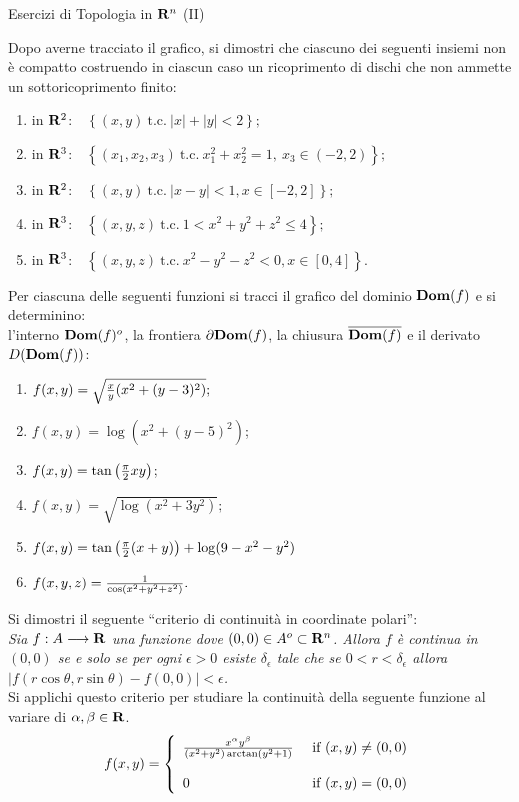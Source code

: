 
\centerline{\Large Esercizi di Topologia in ${\bf R}^n$ (II)}
\bigskip\bigskip
{} Dopo averne tracciato il grafico, si dimostri che
 ciascuno dei seguenti insiemi non \`e compatto costruendo in ciascun caso
un  ricoprimento di dischi che non ammette un sottoricoprimento 
finito:
\begin{enumerate}
\item in ${\bf R}^2$:\ \ $\left\{(x,y)\ \mbox{t.c.}\ |x|+|y|<2\right\};$
\item in ${\bf R}^3$:\ \ $\left\{(x_1,x_2,x_3)\ \mbox{t.c.}\ x_1^2+x_2^2=1,\ 
x_3\in(-2,2)\right\};$
\item in ${\bf R}^2$:\ \ $\left\{(x,y)\ \mbox{t.c.}\ |x-y|<1, x\in[-2,2]
\right\};$
\item in ${\bf R}^3$:\ \ $\left\{(x,y,z)\ \mbox{t.c.}\ 1<x^2+y^2+z^2\leq 4\right\};$
\item in  ${\bf R}^3$:\ \ $\left\{(x,y,z)\ \mbox{t.c.}\ x^2-y^2-z^2<0, x\in[0,4]\right\}.$
\end{enumerate}
\bigskip
{} Per ciascuna delle seguenti funzioni si tracci il grafico del 
dominio ${\bf Dom}(f)$ e si determinino:\\
l'interno ${\bf Dom}(f)^o$,
la frontiera $\partial{\bf Dom}(f)$, la chiusura $\overline{{\bf Dom}(f)}$
e il derivato $D({\bf Dom}(f))$:\medskip
\begin{enumerate}
\item $f(x,y)=\sqrt{{x\over y}(x^2+(y-3)^2)};$
\item $f(x,y)=\log(x^2+(y-5)^2)$;
\item $f(x,y)=\tan\left({\pi\over2}xy\right)$;
\item $f(x,y)=\sqrt{\log(x^2+3y^2)};$
\item $f(x,y)=\tan\left({\pi\over 2}(x+y)\right)+\log(9-x^2-y^2)$
\item $f(x,y,z)={1\over \cos (x^2+y^2+z^2)}.$
\end{enumerate}\bigskip
{} Si dimostri il seguente ``criterio di continuit\`a in coordinate polari'':\\
{\it Sia $f:A\longrightarrow {\bf R}$ una funzione dove $(0,0)\in A^o\subset{\bf R}^n$. Allora
$f$ \`e continua in $(0,0)$ se e solo se per ogni $\epsilon>0$ esiste $\delta_\epsilon$ tale che
se $0<r<\delta_\epsilon$ allora $|f(r\cos\theta,r\sin\theta)-f(0,0)|<\epsilon$.}\\
Si applichi questo criterio per studiare la continuit\`a della seguente funzione al variare di
$\alpha, \beta\in{\bf R}$.
$$f(x,y)=\left\{ \begin{array}{ll}
{x^\alpha y^\beta\over (x^2+y^2)\arctan(y^2+1)} &\ \mbox{if}\ (x,y)\neq(0,0)\\
\\
0 & \ \mbox{if}\ (x,y)=(0,0)\\
\end{array}\right.$$
\bigskip

